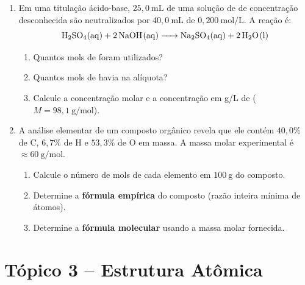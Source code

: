 \documentclass[10pt,a4paper]{article}
\begin{document}
\begin{enumerate}[resume]
\item Em uma titulação ácido-base, $25{,}0~\text{mL}$ de uma
  solução de  de concentração desconhecida são
  neutralizados por $40{,}0~\text{mL}$ de 
  $0{,}200~\text{mol/L}$. A reação é:
  \[
    \ce{H2SO4(aq) + 2 NaOH(aq) -> Na2SO4(aq) + 2 H2O(l)}
  \]
  \begin{enumerate}
    \item Quantos mols de  foram utilizados?
    \item Quantos mols de  havia na alíquota?
    \item Calcule a concentração molar e a concentração em g/L
          de  ($M = 98{,}1~\text{g/mol}$).
  \end{enumerate}

\item A análise elementar de um composto orgânico revela que ele
  contém $40{,}0\%$ de C, $6{,}7\%$ de H e $53{,}3\%$ de O em
  massa. A massa molar experimental é $\approx 60~\text{g/mol}$.
  \begin{enumerate}
    \item Calcule o número de mols de cada elemento em
          $100~\text{g}$ do composto.
    \item Determine a \textbf{fórmula empírica} do composto
          (razão inteira mínima de átomos).
    \item Determine a \textbf{fórmula molecular} usando
          a massa molar fornecida.
  \end{enumerate}

\end{enumerate}

\newpage
\section*{Tópico 3 \; -- \; Estrutura Atômica}
\end{document}
